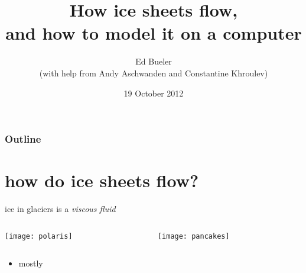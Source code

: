 \documentclass[hide notes,intlimits]{beamer}
\title[ice sheet modelling]{How ice sheets flow, \\ and how to model it on a computer}
\author[Bueler]{Ed Bueler \\ \medskip \scriptsize (with help from Andy Aschwanden and Constantine Khroulev)}
\institute{
  Dept.~of Mathematics and Statistics \\
  and Geophysical Institute\\
  UAF
}
\date{19 October 2012}
\begin{document}


  {
} 


\begin{frame}
  \titlepage
\end{frame}

{
%
} 

\begin{frame}
   \frametitle{Outline}
   \tableofcontents[subsectionstyle=hide/hide/hide]
\end{frame}

  
\section{how do ice sheets flow?}

\begin{frame}{ice in glaciers is a \emph{viscous fluid}}
\begin{columns}
\begin{column}{0.65\textwidth}
\texttt{[image: polaris]}
\end{column}
\begin{column}{0.35\textwidth}
\texttt{[image: pancakes]}
\end{column}
\end{columns}

\bigskip\bigskip
\begin{itemize}
\item mostly
\end{itemize}
\end{frame}
\end{document}
